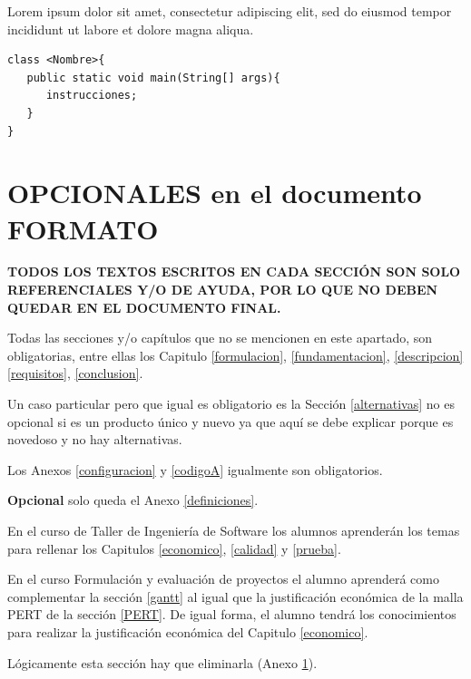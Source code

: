 \documentclass[letter,12pt]{report}
\begin{document}
Lorem ipsum dolor sit amet, consectetur adipiscing elit, sed do eiusmod tempor incididunt ut labore et dolore magna aliqua.

   \lstset{language=java}
\begin{lstlisting}[caption= C\'odigo JAVA de una clase]
class <Nombre>{
   public static void main(String[] args){
      instrucciones;
   }
}
\end{lstlisting}

\chapter{OPCIONALES en el documento FORMATO}\label{opcional}
\textbf{TODOS LOS TEXTOS ESCRITOS EN CADA SECCIÓN SON SOLO REFERENCIALES Y/O DE AYUDA, POR LO QUE NO DEBEN QUEDAR EN EL DOCUMENTO FINAL.}

Todas las secciones y/o capítulos que no se mencionen en este apartado, son obligatorias, entre ellas los Capitulo \ref{formulacion}, \ref{fundamentacion}, \ref{descripcion} \ref{requisitos}, \ref{conclusion}.

Un caso particular pero que igual es obligatorio es la Sección \ref{alternativas} no es opcional si es un producto único y nuevo ya que aquí se debe explicar porque es novedoso y no hay alternativas.

Los Anexos \ref{configuracion} y \ref{codigoA} igualmente son obligatorios.

\textbf{Opcional} solo queda el Anexo \ref{definiciones}.

En el curso de Taller de Ingeniería de Software los alumnos aprenderán los temas para rellenar los Capitulos \ref{economico}, \ref{calidad} y \ref{prueba}.

En el curso Formulación y evaluación de proyectos el alumno aprenderá como complementar la sección \ref{gantt} al igual que la justificación económica de la malla PERT de la sección \ref{PERT}. De igual forma, el alumno tendrá los conocimientos para realizar la justificación económica del Capitulo \ref{economico}.

Lógicamente esta sección hay que eliminarla (Anexo \ref{opcional}).
\end{document}
